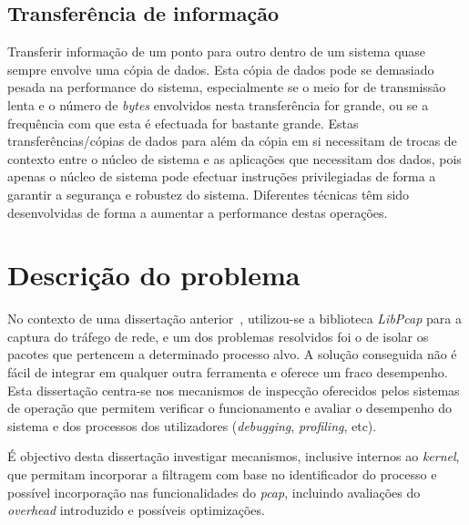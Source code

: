\subsection{Transferência de informação}\label{sect:transf_information}


Transferir informação de um ponto para outro dentro de um sistema quase sempre envolve uma cópia de dados.
Esta cópia de dados pode se demasiado pesada na performance do sistema, especialmente se o meio for de transmissão lenta e o número de \textit{bytes} envolvidos nesta transferência for grande, ou se a frequência com que esta é efectuada for bastante grande.
Estas transferências/cópias de dados para além da cópia em si necessitam de trocas de contexto entre o núcleo de sistema e as aplicações que necessitam dos dados, pois apenas o núcleo de sistema pode efectuar instruções privilegiadas de forma a garantir a segurança e robustez do sistema.
Diferentes técnicas têm sido desenvolvidas de forma a aumentar a performance destas operações. 


\section{Descrição do problema} \label{sect:descricao_prob}
 No contexto de uma dissertação anterior~\cite{Farruca:2009}, utilizou-se a biblioteca \textit{LibPcap} para a captura do tráfego de rede, e um dos problemas resolvidos foi o de isolar os pacotes que pertencem a determinado processo alvo.
A solução conseguida não é fácil de integrar em qualquer outra ferramenta e oferece um fraco desempenho.
Esta dissertação centra-se nos mecanismos de inspecção oferecidos pelos sistemas de operação que permitem verificar o funcionamento e avaliar o desempenho do sistema e dos processos dos utilizadores (\textit{debugging}, \textit{profiling}, etc).

É objectivo desta dissertação investigar mecanismos, inclusive internos ao \textit{kernel}, que permitam incorporar a filtragem com base no identificador do processo e possível incorporação nas funcionalidades do \textit{pcap}, incluindo avaliações do \textit{overhead} introduzido e possíveis optimizações.

